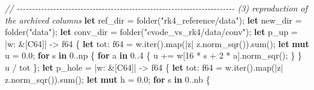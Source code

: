 \documentclass[
  10pt,
]{article}
\newenvironment{Shaded}{}{}
\newcommand{\CommentTok}[1]{\textcolor[rgb]{0.38,0.63,0.69}{\textit{#1}}}
\newcommand{\ControlFlowTok}[1]{\textcolor[rgb]{0.00,0.44,0.13}{\textbf{#1}}}
\newcommand{\DataTypeTok}[1]{\textcolor[rgb]{0.56,0.13,0.00}{#1}}
\newcommand{\DecValTok}[1]{\textcolor[rgb]{0.25,0.63,0.44}{#1}}
\newcommand{\KeywordTok}[1]{\textcolor[rgb]{0.00,0.44,0.13}{\textbf{#1}}}
\newcommand{\NormalTok}[1]{#1}
\newcommand{\OperatorTok}[1]{\textcolor[rgb]{0.40,0.40,0.40}{#1}}
\newcommand{\StringTok}[1]{\textcolor[rgb]{0.25,0.44,0.63}{#1}}
\begin{document}
\begin{Shaded}
\begin{Highlighting}[]
    \CommentTok{// {-}{-}{-}{-}{-}{-}{-}{-}{-}{-}{-}{-}{-}{-}{-}{-}{-}{-}{-}{-}{-}{-}{-}{-}{-}{-}{-}{-}{-}{-}{-}{-}{-}{-}{-}{-}{-}{-}{-}{-}{-}{-}{-}{-}{-}{-}{-}{-}{-}{-}{-}{-}{-}{-}{-}{-}{-}{-}{-}{-}{-}{-}{-}{-}{-}{-}{-}{-}{-}{-}{-}{-} (3) reproduction of the archived columns}
    \KeywordTok{let}\NormalTok{ ref\_dir }\OperatorTok{=}\NormalTok{ folder(}\StringTok{"rk4\_reference/data"}\NormalTok{)}\OperatorTok{;}
    \KeywordTok{let}\NormalTok{ new\_dir }\OperatorTok{=}\NormalTok{ folder(}\StringTok{"data"}\NormalTok{)}\OperatorTok{;}
    \KeywordTok{let}\NormalTok{ conv\_dir }\OperatorTok{=}\NormalTok{ folder(}\StringTok{"cvode\_vs\_rk4/data/conv"}\NormalTok{)}\OperatorTok{;}
    \KeywordTok{let}\NormalTok{ p\_up }\OperatorTok{=} \OperatorTok{|}\NormalTok{w}\OperatorTok{:} \OperatorTok{\&}\NormalTok{[C64]}\OperatorTok{|} \OperatorTok{{-}\textgreater{}} \DataTypeTok{f64} \OperatorTok{\{}
        \KeywordTok{let}\NormalTok{ tot}\OperatorTok{:} \DataTypeTok{f64} \OperatorTok{=}\NormalTok{ w}\OperatorTok{.}\NormalTok{iter()}\OperatorTok{.}\NormalTok{map(}\OperatorTok{|}\NormalTok{z}\OperatorTok{|}\NormalTok{ z}\OperatorTok{.}\NormalTok{norm\_sqr())}\OperatorTok{.}\NormalTok{sum()}\OperatorTok{;}
        \KeywordTok{let} \KeywordTok{mut}\NormalTok{ u }\OperatorTok{=} \DecValTok{0.0}\OperatorTok{;}
        \ControlFlowTok{for}\NormalTok{ s }\KeywordTok{in} \DecValTok{0}\OperatorTok{..}\NormalTok{np }\OperatorTok{\{}
            \ControlFlowTok{for}\NormalTok{ a }\KeywordTok{in} \DecValTok{0}\OperatorTok{..}\DecValTok{4} \OperatorTok{\{}
\NormalTok{                u }\OperatorTok{+=}\NormalTok{ w[}\DecValTok{16} \OperatorTok{*}\NormalTok{ s }\OperatorTok{+} \DecValTok{2} \OperatorTok{*}\NormalTok{ a]}\OperatorTok{.}\NormalTok{norm\_sqr()}\OperatorTok{;}
            \OperatorTok{\}}
        \OperatorTok{\}}
\NormalTok{        u }\OperatorTok{/}\NormalTok{ tot}
    \OperatorTok{\};}
    \KeywordTok{let}\NormalTok{ p\_hole }\OperatorTok{=} \OperatorTok{|}\NormalTok{w}\OperatorTok{:} \OperatorTok{\&}\NormalTok{[C64]}\OperatorTok{|} \OperatorTok{{-}\textgreater{}} \DataTypeTok{f64} \OperatorTok{\{}
        \KeywordTok{let}\NormalTok{ tot}\OperatorTok{:} \DataTypeTok{f64} \OperatorTok{=}\NormalTok{ w}\OperatorTok{.}\NormalTok{iter()}\OperatorTok{.}\NormalTok{map(}\OperatorTok{|}\NormalTok{z}\OperatorTok{|}\NormalTok{ z}\OperatorTok{.}\NormalTok{norm\_sqr())}\OperatorTok{.}\NormalTok{sum()}\OperatorTok{;}
        \KeywordTok{let} \KeywordTok{mut}\NormalTok{ h }\OperatorTok{=} \DecValTok{0.0}\OperatorTok{;}
        \ControlFlowTok{for}\NormalTok{ s }\KeywordTok{in} \DecValTok{0}\OperatorTok{..}\NormalTok{nb }\OperatorTok{\{}

\end{Highlighting}
\end{Shaded}
\end{document}
